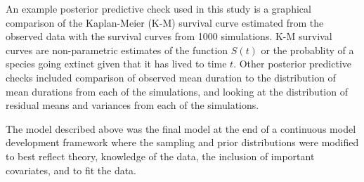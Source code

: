 \documentclass[12pt,letterpaper]{article}
\begin{document}
An example posterior predictive check used in this study is a graphical comparison of the Kaplan-Meier (K-M) survival curve estimated from the observed data with the survival curves from 1000 simulations. K-M survival curves are non-parametric estimates of the function \(S(t)\) or the probablity of a species going extinct given that it has lived to time \(t\). Other posterior predictive checks included comparison of observed mean duration to the distribution of mean durations from each of the simulations, and looking at the distribution of residual means and variances from each of the simulations.

The model described above was the final model at the end of a continuous model development framework where the sampling and prior distributions were modified to best reflect theory, knowledge of the data, the inclusion of important covariates, and to fit the data.
\end{document}
